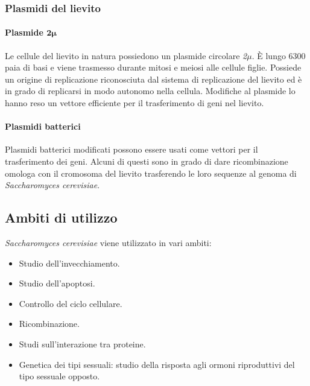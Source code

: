 		\subsubsection*{Plasmidi del lievito}

			\paragraph*{Plasmide \emph{$\mathbf{2\mu}$}}
			Le cellule del lievito in natura possiedono un plasmide circolare \emph{2$\mu$}.
			\`E lungo \num{6300} paia di basi e viene trasmesso durante mitosi e meiosi alle cellule figlie.
			Possiede un origine di replicazione riconosciuta dal sistema di replicazione del lievito ed \`e in grado di replicarsi in modo autonomo nella cellula.
			Modifiche al plasmide lo hanno reso un vettore efficiente per il trasferimento di geni nel lievito.

			\paragraph*{Plasmidi batterici}
			Plasmidi batterici modificati possono essere usati come vettori per il trasferimento dei geni.
			Alcuni di questi sono in grado di dare ricombinazione omologa con il cromosoma del lievito trasferendo le loro sequenze al genoma di \emph{Saccharomyces cerevisiae}.

	\subsection*{Ambiti di utilizzo}
	\emph{Saccharomyces cerevisiae} viene utilizzato in vari ambiti:
	\begin{multicols}{2}
		\begin{itemize}
			\item Studio dell'invecchiamento.
			\item Studio dell'apoptosi.
			\item Controllo del ciclo cellulare.
			\item Ricombinazione.
			\item Studi sull'interazione tra proteine.
			\item Genetica dei tipi sessuali: studio della risposta agli ormoni riproduttivi del tipo sessuale opposto.
		\end{itemize}
	\end{multicols}
